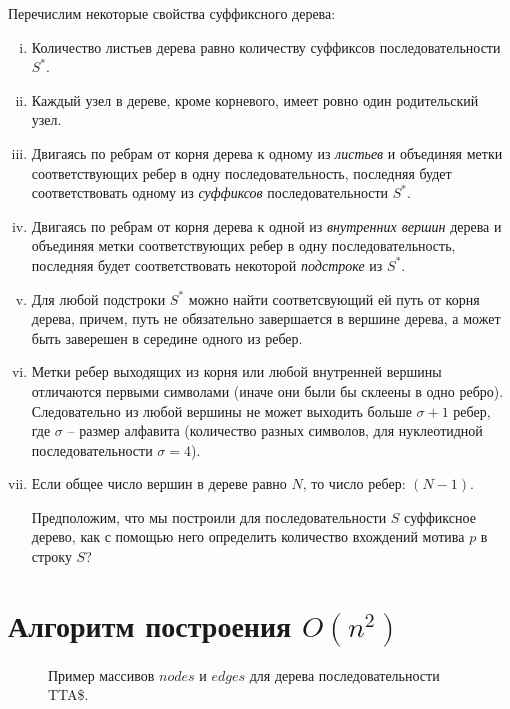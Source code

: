 \documentclass[letterpaper, 11pt]{article}
\begin{document}
\clearpage
Перечислим некоторые свойства суффиксного дерева:
\begin{enumerate}[(i)]
\item
Количество листьев дерева равно количеству суффиксов последовательности $S^*$.
\item
Каждый узел в дереве, кроме корневого, имеет ровно один родительский узел.
\item
Двигаясь по ребрам от корня дерева к одному из \textit{листьев} и объединяя метки соответствующих ребер в одну последовательность, последняя будет соответствовать одному из \textit{суффиксов} последовательности $S^*$.
\item
Двигаясь по ребрам от корня дерева к одной из \textit{внутренних вершин} дерева и объединяя метки соответствующих ребер в одну последовательность, последняя будет соответствовать некоторой \textit{подстроке} из $S^*$.
\item
Для любой подстроки $S^*$ можно найти соответсвующий ей путь от корня дерева, причем, путь не обязательно завершается в вершине дерева, а может быть заверешен в середине одного из ребер.
\item
Метки ребер выходящих из корня или любой внутренней вершины отличаются первыми символами (иначе они были бы склеены в одно ребро). Следовательно из любой вершины не может выходить больше $\sigma + 1$ ребер, где $\sigma$ -- размер алфавита (количество разных символов, для нуклеотидной последовательности $\sigma = 4$).
\item
Если общее число вершин в дереве равно $N$, то число ребер: $(N - 1)$.

Предположим, что мы построили для последовательности $S$ суффиксное дерево, как с помощью него определить количество вхождений мотива $p$ в строку $S$?
\end{enumerate}

\clearpage
\section{Алгоритм построения $O(n^2)$}

\begin{figure}[H]
  \caption{Пример массивов $nodes$ и $edges$ для дерева последовательности TTA\$.}
\end{figure}
\end{document}
